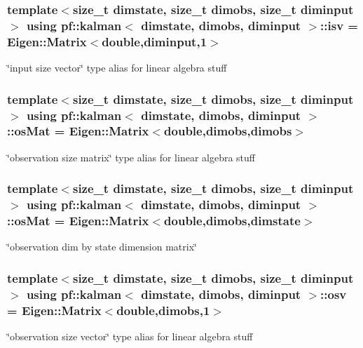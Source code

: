 \subsubsection[{\texorpdfstring{isv}{isv}}]{\setlength{\rightskip}{0pt plus 5cm}template$<$size\+\_\+t dimstate, size\+\_\+t dimobs, size\+\_\+t diminput$>$ using {\bf pf\+::kalman}$<$ dimstate, dimobs, diminput $>$\+::{\bf isv} =  Eigen\+::\+Matrix$<$double,diminput,1$>$\hspace{0.3cm}{\ttfamily [private]}}\hypertarget{classpf_1_1kalman_a6cbcd532087d0b69bcf1825d8d4ac25a}{}\label{classpf_1_1kalman_a6cbcd532087d0b69bcf1825d8d4ac25a}
\char`\"{}input size vector\char`\"{} type alias for linear algebra stuff 
\subsubsection[{\texorpdfstring{os\+Mat}{osMat}}]{\setlength{\rightskip}{0pt plus 5cm}template$<$size\+\_\+t dimstate, size\+\_\+t dimobs, size\+\_\+t diminput$>$ using {\bf pf\+::kalman}$<$ dimstate, dimobs, diminput $>$\+::{\bf os\+Mat} =  Eigen\+::\+Matrix$<$double,dimobs,dimobs$>$\hspace{0.3cm}{\ttfamily [private]}}\hypertarget{classpf_1_1kalman_a41a83764417fa43c3eb0898676791efa}{}\label{classpf_1_1kalman_a41a83764417fa43c3eb0898676791efa}
\char`\"{}observation size matrix\char`\"{} type alias for linear algebra stuff 
\subsubsection[{\texorpdfstring{os\+Mat}{osMat}}]{\setlength{\rightskip}{0pt plus 5cm}template$<$size\+\_\+t dimstate, size\+\_\+t dimobs, size\+\_\+t diminput$>$ using {\bf pf\+::kalman}$<$ dimstate, dimobs, diminput $>$\+::{\bf os\+Mat} =  Eigen\+::\+Matrix$<$double,dimobs,dimstate$>$\hspace{0.3cm}{\ttfamily [private]}}\hypertarget{classpf_1_1kalman_a420f98a9c405f6b05987adafa82e8b52}{}\label{classpf_1_1kalman_a420f98a9c405f6b05987adafa82e8b52}
\char`\"{}observation dim by state dimension matrix\char`\"{} 
\subsubsection[{\texorpdfstring{osv}{osv}}]{\setlength{\rightskip}{0pt plus 5cm}template$<$size\+\_\+t dimstate, size\+\_\+t dimobs, size\+\_\+t diminput$>$ using {\bf pf\+::kalman}$<$ dimstate, dimobs, diminput $>$\+::{\bf osv} =  Eigen\+::\+Matrix$<$double,dimobs,1$>$\hspace{0.3cm}{\ttfamily [private]}}\hypertarget{classpf_1_1kalman_a0568355548ed0e2cae065b489b2428c1}{}\label{classpf_1_1kalman_a0568355548ed0e2cae065b489b2428c1}
\char`\"{}observation size vector\char`\"{} type alias for linear algebra stuff 
